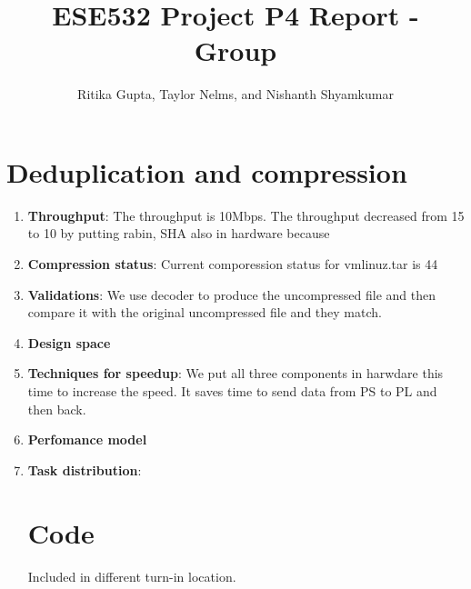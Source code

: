 \documentclass{article}
\title{ESE532 Project P4 Report - Group}
\author{Ritika Gupta, Taylor Nelms, and Nishanth Shyamkumar}
\begin{document}
\maketitle


\section{Deduplication and compression}
\begin{enumerate}
\item%
\textbf{Throughput}: The throughput is 10Mbps. The throughput decreased from 15 to 10 by putting rabin, SHA also in hardware because 
\newline

\item%
\textbf{Compression status}: Current comporession status for vmlinuz.tar is 44%
\newline

\item%
\textbf{Validations}: We use decoder to produce the uncompressed file and then compare it with the original uncompressed file and they match.
\newline

\item%
\textbf{Design space}
\newline

\item%
\textbf{Techniques for speedup}: We put all three components in harwdare this time to increase the speed. It saves time to send data from PS to PL and then back. 
\newline


\item%
\textbf{Perfomance model}
\newline


\item%
\textbf{Task distribution}: 
\newline

\section{Code}

Included in different turn-in location.


\end{enumerate}
\end{document}
